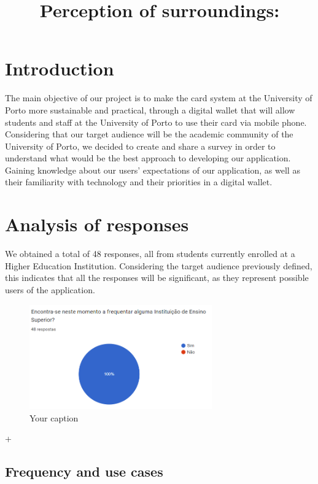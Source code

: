 \documentclass{article}
\begin{document}
\title{Perception of surroundings:}
\maketitle

\section{Introduction}

The main objective of our project is to make the card system at the University of Porto more sustainable and practical, through a digital wallet that will allow students and staff at the University of Porto to use their card via mobile phone.
Considering that our target audience will be the academic community of the University of Porto, we decided to create and share a survey in order to understand what would be the best approach to developing our application.
Gaining knowledge about our users' expectations of our application, as well as their familiarity with technology and their priorities in a digital wallet.

\section{Analysis of responses}


We obtained a total of 48 responses, all from students currently enrolled at a Higher Education Institution. Considering the target audience previously defined, this indicates that all the responses will be significant, as they represent possible users of the application.

\begin{figure}[h]
    \centering
    \includegraphics[width=0.7\textwidth]{images/questionaire1.png}
    \caption{Your caption}
\end{figure}


+
\subsection{Frequency and use cases}
\end{document}
